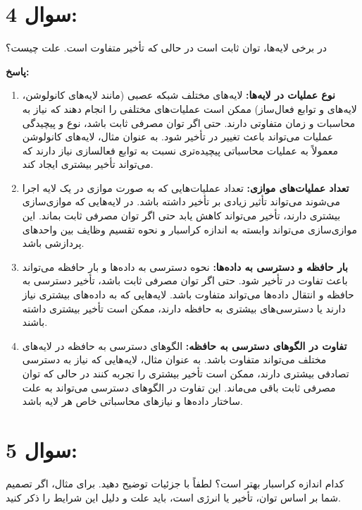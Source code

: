 \documentclass[12pt]{exam}
\begin{document}
\begin{questions}
	
	
	\section*{سوال 4:}
	در برخی لایه‌ها، توان ثابت است در حالی که تأخیر متفاوت است. علت چیست؟
	
	\textbf{پاسخ:‌ }
	
	\begin{enumerate}
		\item \textbf{نوع عملیات در لایه‌ها:}
		لایه‌های مختلف شبکه عصبی (مانند لایه‌های کانولوشن، لایه‌های  و توابع فعال‌ساز) ممکن است عملیات‌های مختلفی را انجام دهند که نیاز به محاسبات و زمان متفاوتی دارند. حتی اگر توان مصرفی ثابت باشد، نوع و پیچیدگی عملیات می‌تواند باعث تغییر در تأخیر شود. به عنوان مثال، لایه‌های کانولوشن معمولاً به عملیات محاسباتی پیچیده‌تری نسبت به توابع فعالسازی نیاز دارند که می‌تواند تأخیر بیشتری ایجاد کند.
		
		\item \textbf{تعداد عملیات‌های موازی:}
		تعداد عملیات‌هایی که به صورت موازی در یک لایه اجرا می‌شوند می‌تواند تأثیر زیادی بر تأخیر داشته باشد. در لایه‌هایی که موازی‌سازی بیشتری دارند، تأخیر می‌تواند کاهش یابد حتی اگر توان مصرفی ثابت بماند. این موازی‌سازی می‌تواند وابسته به اندازه کراسبار و نحوه تقسیم وظایف بین واحدهای پردازشی باشد.
		
		\item \textbf{بار حافظه و دسترسی به داده‌ها:}
		نحوه دسترسی به داده‌ها و بار حافظه می‌تواند باعث تفاوت در تأخیر شود. حتی اگر توان مصرفی ثابت باشد، تأخیر دسترسی به حافظه و انتقال داده‌ها می‌تواند متفاوت باشد. لایه‌هایی که به داده‌های بیشتری نیاز دارند یا دسترسی‌های بیشتری به حافظه دارند، ممکن است تأخیر بیشتری داشته باشند.
		
		\item \textbf{تفاوت در الگوهای دسترسی به حافظه:}
		الگوهای دسترسی به حافظه در لایه‌های مختلف می‌تواند متفاوت باشد. به عنوان مثال، لایه‌هایی که نیاز به دسترسی تصادفی بیشتری دارند، ممکن است تأخیر بیشتری را تجربه کنند در حالی که توان مصرفی ثابت باقی می‌ماند. این تفاوت در الگوهای دسترسی می‌تواند به علت ساختار داده‌ها و نیازهای محاسباتی خاص هر لایه باشد.
	\end{enumerate}
	
	
	
	
	\section*{سوال 5:}
	کدام اندازه کراسبار بهتر است؟ لطفاً با جزئیات توضیح دهید. برای مثال، اگر تصمیم شما بر اساس توان، تأخیر یا انرژی است، باید علت و دلیل این شرایط را ذکر کنید.
	

\end{questions}
\end{document}

